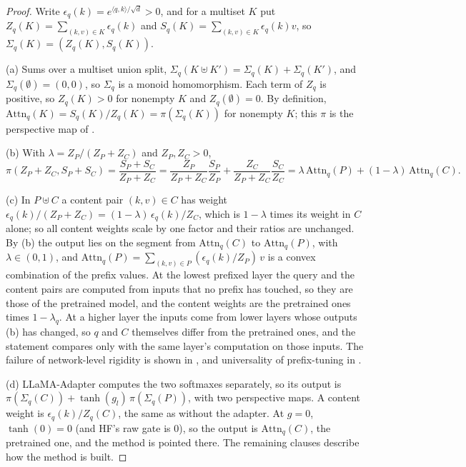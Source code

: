 \begin{proof}
Write $\epsilon_q(k)=e^{\langle q,k\rangle/\sqrt d}>0$, and for a multiset $K$ put $Z_q(K)=\sum_{(k,v)\in K}\epsilon_q(k)$ and
$S_q(K)=\sum_{(k,v)\in K}\epsilon_q(k)v$, so $\Sigma_q(K)=(Z_q(K),S_q(K))$.

(a) Sums over a multiset union split, $\Sigma_q(K\uplus K')=\Sigma_q(K)+\Sigma_q(K')$, and $\Sigma_q(\emptyset)=(0,0)$, so
$\Sigma_q$ is a monoid homomorphism. Each term of $Z_q$ is positive, so $Z_q(K)>0$ for nonempty $K$ and $Z_q(\emptyset)=0$. By
definition, $\mathrm{Attn}_q(K)=S_q(K)/Z_q(K)=\pi(\Sigma_q(K))$ for nonempty $K$; this $\pi$ is the perspective map of
.

(b) With $\lambda=Z_P/(Z_P+Z_C)$ and $Z_P,Z_C>0$,
\[\pi(Z_P+Z_C,S_P+S_C)=\frac{S_P+S_C}{Z_P+Z_C}=\frac{Z_P}{Z_P+Z_C}\frac{S_P}{Z_P}+\frac{Z_C}{Z_P+Z_C}\frac{S_C}{Z_C}
=\lambda\,\mathrm{Attn}_q(P)+(1-\lambda)\,\mathrm{Attn}_q(C).\]

(c) In $P\uplus C$ a content pair $(k,v)\in C$ has weight $\epsilon_q(k)/(Z_P+Z_C)=(1-\lambda)\,\epsilon_q(k)/Z_C$, which is
$1-\lambda$ times its weight in $C$ alone; so all content weights scale by one factor and their ratios are unchanged. By (b)
the output lies on the segment from $\mathrm{Attn}_q(C)$ to $\mathrm{Attn}_q(P)$, with $\lambda\in(0,1)$, and
$\mathrm{Attn}_q(P)=\sum_{(k,v)\in P}(\epsilon_q(k)/Z_P)\,v$ is a convex combination of the prefix values. At the lowest
prefixed layer the query and the content pairs are computed from inputs that no prefix has touched, so they are those of the
pretrained model, and the content weights are the pretrained ones times $1-\lambda_q$. At a higher layer the inputs come from
lower layers whose outputs (b) has changed, so $q$ and $C$ themselves differ from the pretrained ones, and the statement
compares only with the same layer's computation on those inputs. The failure of network-level rigidity is shown in
\citet[\S6]{petrov2023prompting}, and universality of prefix-tuning in \citet{petrov2024prompting}.

(d) LLaMA-Adapter \citep{zhang2023llama} computes the two softmaxes separately, so its output is
$\pi(\Sigma_q(C))+\tanh(g_l)\,\pi(\Sigma_q(P))$, with two perspective maps. A content weight is $\epsilon_q(k)/Z_q(C)$, the same as
without the adapter. At $g=0$, $\tanh(0)=0$ (and HF's raw gate is $0$), so the output is $\mathrm{Attn}_q(C)$, the pretrained
one, and the method is pointed there. The remaining clauses describe how the method is built.


\end{proof}
